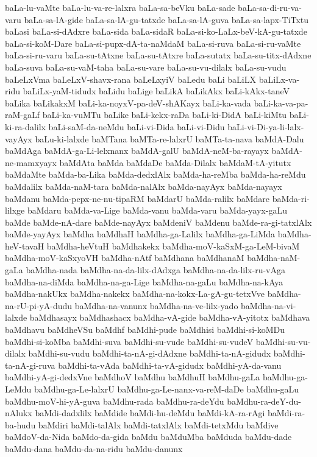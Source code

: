 {baLa-lu-vaMte
baLa-lu-va-re-lalxra
baLa-sa-beVku
baLa-sade
baLa-sa-di-ru-va-varu
baLa-sa-lA-gide
baLa-sa-lA-gu-tatxde
baLa-sa-lA-guva
baLa-sa-lapx-TiTxtu
baLasi
baLa-si-dAdxre
baLa-sida
baLa-sidaR
baLa-si-ko-LaLx-beV-kA-gu-tatxde
baLa-si-koM-Dare
baLa-si-pupx-dA-ta-naMdaM
baLa-si-ruva
baLa-si-ru-vaMte
baLa-si-ru-varu
baLa-su-tAtxne
baLa-su-tAtxre
baLa-sutatx
baLa-su-titx-dAdxne
baLa-suva
baLa-su-vaM-taha
baLa-su-vare
baLa-su-vu-dilalx
baLa-su-vudu
baLeLxVma
baLeLxV-shavx-rana
baLeLxyiV
baLedu
baLi
baLiLX
baLiLx-va-ridu
baLiLx-yaM-tidudx
baLidu
baLige
baLikA
baLikAkx
baLi-kAkx-taneV
baLika
baLikakxM
baLi-ka-noyxV-pa-deV-shAKayx
baLi-ka-vada
baLi-ka-va-pa-raM-gaLf
baLi-ka-vuMTu
baLike
baLi-kekx-raDa
baLi-ki-DidA
baLi-kiMtu
baLi-ki-ra-dalilx
baLi-saM-da-neMdu
baLi-vi-Dida
baLi-vi-Didu
baLi-vi-Di-ya-li-lalx-vayAyx
baLu-ki-lalxde
baMTana
baMTa-re-lalxrU
baMTa-ta-nava
baMdA-Dalu
baMdAga
baMdA-ga-Li-lelxnanx
baMdA-galU
baMdA-neM-ba-rayayx
baMdA-ne-mamxyayx
baMdAta
baMda
baMdaDe
baMda-Dilalx
baMdaM-tA-yitutx
baMdaMte
baMda-ba-Lika
baMda-dedxlAlx
baMda-ha-reMba
baMda-ha-reMdu
baMdalilx
baMda-naM-tara
baMda-nalAlx
baMda-nayAyx
baMda-nayayx
baMdanu
baMda-pepx-ne-nu-tipaRM
baMdarU
baMda-ralilx
baMdare
baMda-ri-lilxge
baMdaru
baMda-va-Lige
baMda-vanu
baMda-varu
baMda-yayx-gaLu
baMde
baMde-nA-dare
baMde-nayAyx
baMdeniV
baMdenu
baMde-ra-gi-tatxlAlx
baMde-yayAyx
baMdha
baMdhaH
baMdha-ga-Lalilx
baMdha-ga-LiMda
baMdha-heV-tavaH
baMdha-heVtuH
baMdhakekx
baMdha-moV-kaSxM-ga-LeM-bivaM
baMdha-moV-kaSxyoVH
baMdha-nAtf
baMdhana
baMdhanaM
baMdha-naM-gaLa
baMdha-nada
baMdha-na-da-lilx-dAdxga
baMdha-na-da-lilx-ru-vAga
baMdha-na-diMda
baMdha-na-ga-Lige
baMdha-na-gaLu
baMdha-na-kAya
baMdha-nakUkx
baMdha-nakekx
baMdha-na-kokx-La-gA-gu-tetxVve
baMdha-na-rU-pi-yA-dudu
baMdha-na-vanunx
baMdha-na-ve-lilx-yado
baMdha-na-vi-lalxde
baMdhasayx
baMdhashacx
baMdha-vA-gide
baMdha-vA-yitotx
baMdhava
baMdhavu
baMdheVSu
baMdhf
baMdhi-pude
baMdhisi
baMdhi-si-koMDu
baMdhi-si-koMba
baMdhi-suva
baMdhi-su-vude
baMdhi-su-vudeV
baMdhi-su-vu-dilalx
baMdhi-su-vudu
baMdhi-ta-nA-gi-dAdxne
baMdhi-ta-nA-gidudx
baMdhi-ta-nA-gi-ruva
baMdhi-ta-vAda
baMdhi-ta-vA-gidudx
baMdhi-yA-da-vanu
baMdhi-yA-gi-dedxVne
baMdhoV
baMdhu
baMdhuH
baMdhu-gaLa
baMdhu-ga-LeMdu
baMdhu-ga-Le-lalxrU
baMdhu-ga-Le-nanx-va-reM-daDe
baMdhu-gaLu
baMdhu-moV-hi-yA-guva
baMdhu-rada
baMdhu-ra-deYdu
baMdhu-ra-deY-du-nAlukx
baMdi-dadxlilx
baMdide
baMdi-hu-deMdu
baMdi-kA-ra-rAgi
baMdi-ra-ba-hudu
baMdiri
baMdi-talAlx
baMdi-tatxlAlx
baMdi-tetxMdu
baMdive
baMdoV-da-Nida
baMdo-da-gida
baMdu
baMduMba
baMduda
baMdu-dade
baMdu-dana
baMdu-da-na-ridu
baMdu-danunx
}
